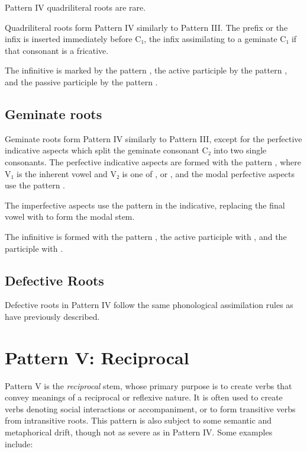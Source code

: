 \documentclass[grammar]{subfiles}
\begin{document}
Pattern IV quadriliteral roots are rare. 

Quadriliteral roots form Pattern IV similarly to Pattern III. The prefix
 or the infix  is inserted immediately before C₁, the infix
assimilating to a geminate C₁ if that consonant is a fricative. 

The infinitive is marked by the pattern , the active participle
by the pattern , and the passive participle by the pattern
.


\subsection{Geminate roots}
\label{ssec:vm:iv_geminate_roots}

Geminate roots form Pattern IV similarly to Pattern III, except for the
perfective indicative aspects which split the geminate consonant C₂ into two
single consonants.   The perfective indicative aspects are formed with the
pattern , where V₁ is the inherent vowel and V₂ is one of
,  or , and the modal perfective aspects use the pattern
.  

The imperfective aspects use the pattern  in the indicative,
replacing the final vowel with  to form the modal stem. 

The infinitive is formed with the pattern , the active participle
with , and the participle with .  



\subsection{Defective Roots}
\label{ssec:vm:iv_defective_roots}

Defective roots in Pattern IV follow the same phonological assimilation rules
as have previously described. 


\clearpage
\section{Pattern V: Reciprocal}
\label{sec:vm:pattern_v}

Pattern V is the \emph{reciprocal} stem, whose primary purpose is to create verbs that
convey meanings of a reciprocal or reflexive nature.  It is often used to
create verbs denoting social interactions or accompaniment, or to form
transitive verbs from intransitive roots.  This pattern is also subject to some
semantic and metaphorical drift, though not as severe as in Pattern IV. Some examples include:
\end{document}

